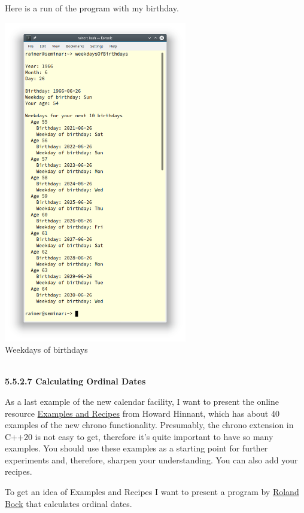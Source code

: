 Here is a run of the program with my birthday.

\begin{center}
\includegraphics[width=0.6\textwidth]{content/3/chapter5/images/25.png}\\
Weekdays of birthdays
\end{center}

\hspace*{\fill} \\ %
\noindent
\textbf{5.5.2.7\hspace{0.2cm} Calculating Ordinal Dates}

As a last example of the new calendar facility, I want to present the online resource \href{https://github.com/HowardHinnant/date/wiki/Examples-and-Recipes}{Examples and Recipes} from Howard Hinnant, which has about 40 examples of the new chrono functionality. Presumably, the chrono extension in C++20 is not easy to get, therefore it’s quite important to have so many examples. You should use these examples as a starting point for further experiments and, therefore, sharpen your understanding. You can also add your recipes.

To get an idea of Examples and Recipes I want to present a program by \href{https://github.com/rbock}{Roland Bock} that calculates ordinal dates.

